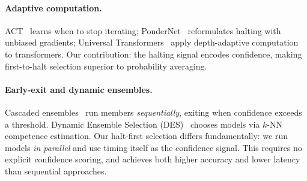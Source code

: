 \paragraph{Adaptive computation.}
ACT~\citep{graves2016act} learns when to stop iterating;
PonderNet~\citep{banino2021pondernet} reformulates halting with unbiased
gradients; Universal Transformers~\citep{dehghani2018universal} apply
depth-adaptive computation to transformers. Our contribution: the halting signal
encodes confidence, making first-to-halt selection superior to probability averaging.

%

\paragraph{Early-exit and dynamic ensembles.}
Cascaded ensembles~\citep{xia2023earlyexit} run members \emph{sequentially},
exiting when confidence exceeds a threshold. Dynamic Ensemble Selection
(DES)~\citep{cruz2018deslib} chooses models via $k$-NN competence estimation.
Our halt-first selection differs fundamentally: we run models \emph{in parallel}
and use timing itself as the confidence signal. This requires no explicit
confidence scoring, and achieves both higher accuracy and lower latency than
sequential approaches.

